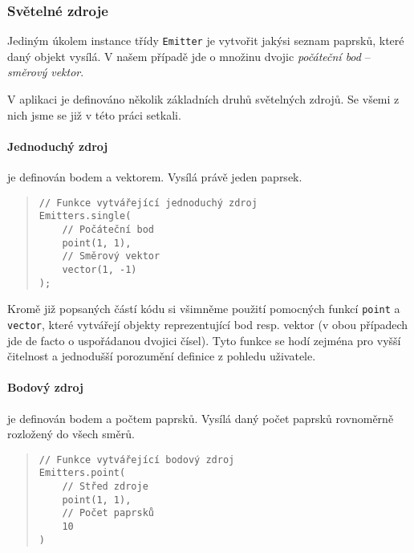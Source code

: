 \subsubsection{Světelné zdroje}

Jediným úkolem instance třídy \texttt{Emitter} je vytvořit jakýsi seznam paprsků, které daný objekt vysílá. V našem případě jde o množinu dvojic \emph{počáteční bod} -- \emph{směrový vektor}.

V aplikaci je definováno několik základních druhů světelných zdrojů. Se všemi z nich jsme se již v této práci setkali.

\paragraph{Jednoduchý zdroj} je definován bodem a vektorem. Vysílá právě jeden paprsek.

\begin{minipage}{\textwidth}\begin{quote}\begin{lstlisting}
// Funkce vytvářející jednoduchý zdroj
Emitters.single(
    // Počáteční bod
    point(1, 1),
    // Směrový vektor
    vector(1, -1)
);
\end{lstlisting}\end{quote}\end{minipage}


Kromě již popsaných částí kódu si všimněme použití pomocných funkcí \texttt{point} a \texttt{vector}, které vytvářejí objekty reprezentující bod resp. vektor (v obou případech jde de facto o uspořádanou dvojici čísel). Tyto funkce se hodí zejména pro vyšší čitelnost a jednodušší porozumění definice z pohledu uživatele.

\paragraph{Bodový zdroj} je definován bodem a počtem paprsků. Vysílá daný počet paprsků rovnoměrně rozložený do všech směrů.

\begin{minipage}{\textwidth}\begin{quote}\begin{lstlisting}
// Funkce vytvářející bodový zdroj
Emitters.point(
    // Střed zdroje
    point(1, 1),
    // Počet paprsků
    10
)
\end{lstlisting}\end{quote}\end{minipage}

